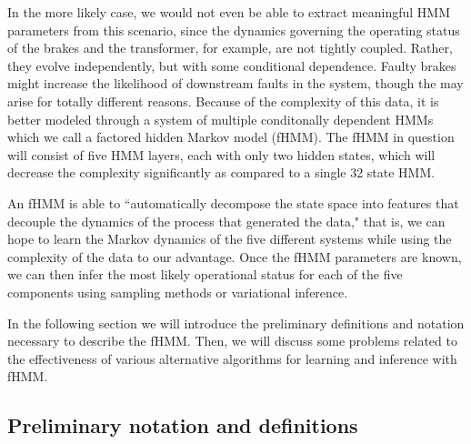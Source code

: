 \documentclass{article}
\begin{document}
In the more likely case, we would not even be able to extract meaningful HMM parameters from this scenario, since the dynamics governing the operating status of the brakes and the transformer, for example, are not tightly coupled.  Rather, they evolve independently, but with some conditional dependence.  Faulty brakes might increase the likelihood of downstream faults in the system, though the may arise for totally different reasons. Because of the complexity of this data, it is better modeled through a system of multiple conditonally dependent HMMs which we call a factored hidden Markov model (fHMM).  The fHMM in question will consist of five HMM layers, each with only two hidden states, which will decrease the complexity significantly as compared to a single 32 state HMM.

An fHMM is able to ``automatically decompose the state space into features that decouple the dynamics of the process that generated the data," \cite{GJ95} that is, we can hope to learn the Markov dynamics of the five different systems while using the complexity of the data to our advantage.  Once the fHMM parameters are known, we can then infer the most likely operational status for each of the five components using sampling methods or variational inference. 

In the following section we will introduce the preliminary definitions and notation necessary to describe the fHMM.  Then, we will discuss some problems related to the effectiveness of various alternative algorithms for learning and inference with fHMM.

\subsection{Preliminary notation and definitions}
\end{document}
